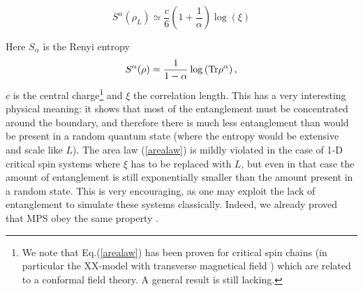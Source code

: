 \documentclass[aps,prl,epsfig,graphics,floatfix,mathbbm,a4paper]{article}
\newcommand{\1}{\mathbbm{1}}
\renewcommand{\>}{\rangle}
\newcommand{\<}{\langle}
\begin{document}
\begin{equation} S^\alpha(\rho_L)\simeq
    \frac{c}{6}\left(1+\frac{1}{\alpha}\right)\log(\xi)\label{arealaw}\end{equation}

Here $S_\alpha$ is the Renyi entropy
\[S^\alpha(\rho)=\frac{1}{1-\alpha}\log\left({\rm Tr}\rho^\alpha\right),\]
$c$ is the central charge\footnote{We note that Eq.(\ref{arealaw})
    has been proven for critical spin chains (in particular the
    XX-model with transverse magnetical field \cite{Jin}) which are
    related to a conformal field theory. A general result is still
    lacking.} and $\xi$ the correlation length. This has a very
interesting physical meaning: it shows that most of the
entanglement must be concentrated around the boundary, and
therefore there is much less entanglement than would be present in
a random quantum state (where the entropy would be extensive and
scale like $L$). The area law (\ref{arealaw}) is mildly violated
in the case of 1-D critical spin systems where $\xi$ has to be
replaced with $L$, but even in that case the amount of
entanglement is still exponentially smaller than the amount
present in a random state. This is very encouraging, as one may
exploit the lack of entanglement to simulate these systems
classically. Indeed, we already proved that MPS obey the same
property \cite{Ortiz}.
\end{document}
